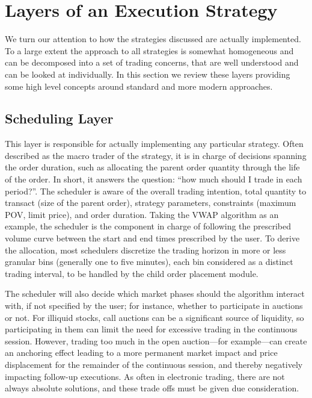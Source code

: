 \section{Layers of an Execution Strategy\label{sec:layer_exec_strat}}\label{in:exec_layer1}

We turn our attention to how the strategies discussed are actually implemented. To a large extent the approach to all strategies is somewhat homogeneous and can be decomposed into a set of trading concerns, that are well understood and can be looked at individually. In this section we review these layers providing some high level concepts around standard and more modern approaches.


\subsection{Scheduling Layer\label{sec:sched_layer}}

This layer is responsible for actually implementing any particular strategy. Often described as the macro trader of the strategy, it is in charge of decisions spanning the order duration, such as allocating the parent order quantity through the life of the order. In short, it answers the question: ``how much should I trade in each period?''. The scheduler is aware of the overall trading intention, total quantity to transact (size of the parent order), strategy parameters, constraints (maximum POV, limit price), and order duration. Taking the VWAP algorithm as an example, the scheduler is the component in charge of following the prescribed volume curve between the start and end times prescribed by the user. To derive the allocation, most schedulers discretize the trading horizon in more or less granular bins (generally one to five minutes), each bin considered as a distinct trading interval, to be handled by the child order placement module.


The scheduler will also decide which market phases should the algorithm interact with, if not specified by the user; for instance, whether to participate in auctions or not. For illiquid stocks, call auctions can be a significant source of liquidity, so participating in them can limit the need for excessive trading in the continuous session. However, trading too much in the open auction---for example---can create an anchoring effect leading to a more permanent market impact and price displacement for the remainder of the continuous session, and thereby negatively impacting follow-up executions. As often in electronic trading, there are not always absolute solutions, and these trade offs must be given due consideration.


